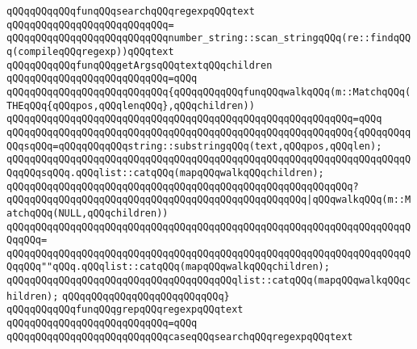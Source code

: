 \newline
\verb|qQQqqQQqqQQqfunqQQqsearchqQQqregexpqQQqtext|\newline
\verb|qQQqqQQqqQQqqQQqqQQqqQQqqQQq=|\newline
\verb|qQQqqQQqqQQqqQQqqQQqqQQqqQQqnumber_string::scan_stringqQQq(re::findqQQq(compileqQQqregexp))qQQqtext|\newline
\newline
\verb|qQQqqQQqqQQqfunqQQqgetArgsqQQqtextqQQqchildren|\newline
\verb|qQQqqQQqqQQqqQQqqQQqqQQqqQQq=qQQq|\newline
\verb|qQQqqQQqqQQqqQQqqQQqqQQqqQQq{qQQqqQQqqQQqfunqQQqwalkqQQq(m::MatchqQQq(THEqQQq{qQQqpos,qQQqlenqQQq},qQQqchildren))|\newline
\verb|qQQqqQQqqQQqqQQqqQQqqQQqqQQqqQQqqQQqqQQqqQQqqQQqqQQqqQQqqQQq=qQQq|\newline
\verb|qQQqqQQqqQQqqQQqqQQqqQQqqQQqqQQqqQQqqQQqqQQqqQQqqQQqqQQqqQQq{qQQqqQQqqQQqsqQQq=qQQqqQQqqQQqstring::substringqQQq(text,qQQqpos,qQQqlen);|\newline
\verb|qQQqqQQqqQQqqQQqqQQqqQQqqQQqqQQqqQQqqQQqqQQqqQQqqQQqqQQqqQQqqQQqqQQqqQQqqQQqsqQQq.qQQqlist::catqQQq(mapqQQqwalkqQQqchildren);|\newline
\verb|qQQqqQQqqQQqqQQqqQQqqQQqqQQqqQQqqQQqqQQqqQQqqQQqqQQqqQQqqQQq?|\newline
\newline
\verb|qQQqqQQqqQQqqQQqqQQqqQQqqQQqqQQqqQQqqQQqqQQqqQQqqQQq|\verb#|qQQqwalkqQQq(m::MatchqQQq(NULL,qQQqchildren))#\newline
\verb|qQQqqQQqqQQqqQQqqQQqqQQqqQQqqQQqqQQqqQQqqQQqqQQqqQQqqQQqqQQqqQQqqQQqqQQqqQQq=|\newline
\verb|qQQqqQQqqQQqqQQqqQQqqQQqqQQqqQQqqQQqqQQqqQQqqQQqqQQqqQQqqQQqqQQqqQQqqQQqqQQq""qQQq.qQQqlist::catqQQq(mapqQQqwalkqQQqchildren);|\newline
\newline
\verb|qQQqqQQqqQQqqQQqqQQqqQQqqQQqqQQqqQQqqQQqlist::catqQQq(mapqQQqwalkqQQqchildren);|\newline
\verb|qQQqqQQqqQQqqQQqqQQqqQQqqQQq}|\newline
\newline
\verb|qQQqqQQqqQQqfunqQQqgrepqQQqregexpqQQqtext|\newline
\verb|qQQqqQQqqQQqqQQqqQQqqQQqqQQq=qQQq|\newline
\verb|qQQqqQQqqQQqqQQqqQQqqQQqqQQqcaseqQQqsearchqQQqregexpqQQqtext|\newline
\newline
